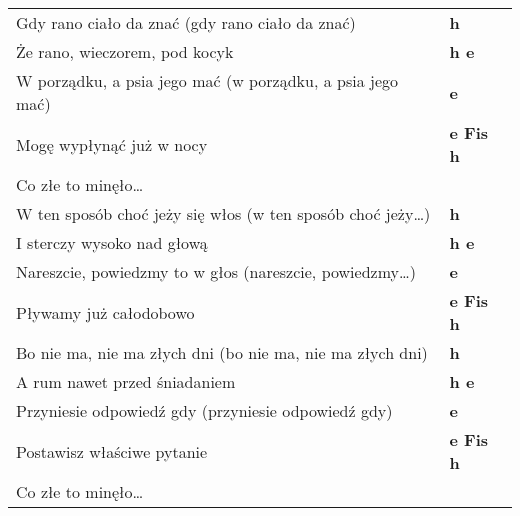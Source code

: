 {\begin{tabular}{@{\hspace{-6mm}}l@{\hspace{4mm}}>{\bfseries}l}
Gdy rano ciało da znać (gdy rano ciało da znać) & h \\
Że rano, wieczorem, pod kocyk & h e \\
W porządku, a psia jego mać (w porządku, a psia jego mać) & e \\
Mogę wypłynąć już w nocy & e Fis h \\[1.5mm]

 Co złe to minęło\ldots \\[1.5mm]

W ten sposób choć jeży się włos (w ten sposób choć jeży\ldots) & h \\
I sterczy wysoko nad głową & h e \\
Nareszcie, powiedzmy to w głos (nareszcie, powiedzmy\ldots) & e\\
Pływamy już całodobowo & e Fis h \\[1.5mm]

Bo nie ma, nie ma złych dni (bo nie ma, nie ma złych dni) & h\\
A rum nawet przed śniadaniem & h e \\
Przyniesie odpowiedź gdy (przyniesie odpowiedź gdy) & e \\
Postawisz właściwe pytanie & e Fis h \\[1.5mm]

 Co złe to minęło\ldots \\
\end{tabular}}